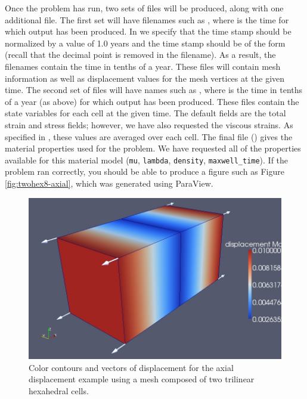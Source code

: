 Once the problem has run, two sets of files will be produced, along
with one additional file. The first set will have filenames such as
, where  is the time for
which output has been produced. In  we specify
that the time stamp should be normalized by a value of 1.0 years and
the time stamp should be of the form  (recall that the
decimal point is removed in the filename). As a result, the filenames
contain the time in tenths of a year. These files will contain mesh
information as well as displacement values for the mesh vertices at
the given time. The second set of files will have names such as
, where  is
the time in tenths of a year (as above) for which output has been
produced. These files contain the state variables for each cell at the
given time. The default fields are the total strain and stress fields;
however, we have also requested the viscous strains. As specified in
, these values are averaged over each
cell. The final file () gives
the material properties used for the problem. We have requested all of
the properties available for this material model (\texttt{mu},
\texttt{lambda}, \texttt{density}, \texttt{maxwell\_time}). If the
problem ran correctly, you should be able to produce a figure such as
Figure \vref{fig:twohex8-axial}, which was generated using ParaView.

\begin{figure}
  \includegraphics[scale=0.33]{examples/figs/twohex8-axialdisp}
  \caption{Color contours and vectors of displacement for the axial displacement
    example using a mesh composed of two trilinear hexahedral cells.}
  \label{fig:twohex8-axial}
\end{figure}


